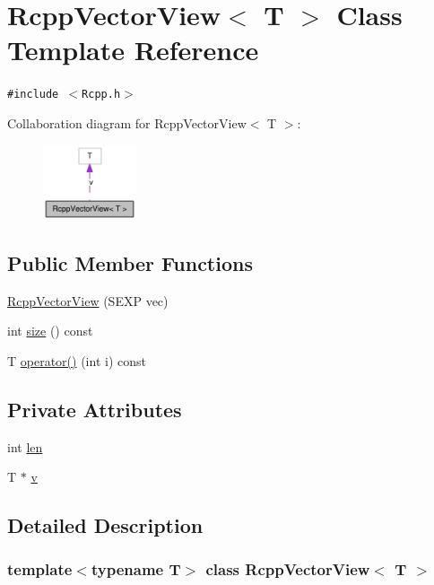 \hypertarget{classRcppVectorView}{
\section{RcppVectorView$<$ T $>$ Class Template Reference}
\label{classRcppVectorView}
}
{\tt \#include $<$Rcpp.h$>$}

Collaboration diagram for RcppVectorView$<$ T $>$:\nopagebreak
\begin{figure}[H]
\begin{center}
\leavevmode
\includegraphics[width=78pt]{classRcppVectorView__coll__graph}
\end{center}
\end{figure}
\subsection*{Public Member Functions}
\begin{CompactItemize}
\item 
\hyperlink{classRcppVectorView_d2e90fed8ee8a40f56591cc94f83041e}{RcppVectorView} (SEXP vec)
\item 
int \hyperlink{classRcppVectorView_d4c0f21296eb1cf7b2e2c8b8b43f4b0d}{size} () const 
\item 
T \hyperlink{classRcppVectorView_13d63e990363a37ae29e0eab7400d297}{operator()} (int i) const 
\end{CompactItemize}
\subsection*{Private Attributes}
\begin{CompactItemize}
\item 
int \hyperlink{classRcppVectorView_da67f9b1481099e4a820deaf4648778b}{len}
\item 
T $\ast$ \hyperlink{classRcppVectorView_e3dc3546d0dd0e3de95800b7c91857e8}{v}
\end{CompactItemize}


\subsection{Detailed Description}
\subsubsection*{template$<$typename T$>$ class RcppVectorView$<$ T $>$}



